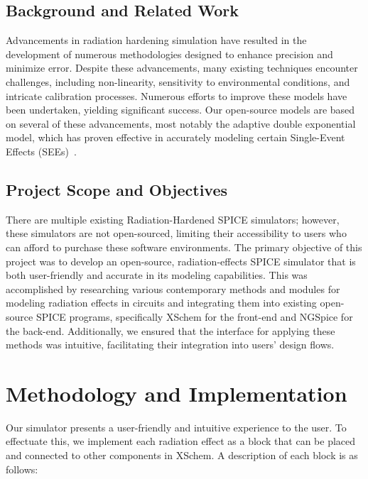 \documentclass[conference]{IEEEtran}
\begin{document}
    \subsection{Background and Related Work}\label{subsec:background-and-related-work}
    Advancements in radiation hardening simulation have resulted in the development of numerous methodologies designed to enhance precision and minimize error.
    Despite these advancements, many existing techniques encounter challenges, including non-linearity, sensitivity to environmental conditions, and intricate calibration processes.
    Numerous efforts to improve these models have been undertaken, yielding significant success.
    Our open-source models are based on several of these advancements, most notably the adaptive double exponential model, which has proven effective in accurately modeling certain Single-Event Effects (SEEs)~\cite{electronics13061073, Pellish2016}.

    \subsection{Project Scope and Objectives}\label{subsec:project-scope-and-objectives}
    There are multiple existing Radiation-Hardened SPICE simulators; however, these simulators are not open-sourced, limiting their accessibility to users who can afford to purchase these software environments.
    The primary objective of this project was to develop an open-source, radiation-effects SPICE simulator that is both user-friendly and accurate in its modeling capabilities.
    This was accomplished by researching various contemporary methods and modules for modeling radiation effects in circuits and integrating them into existing open-source SPICE programs, specifically XSchem for the front-end and NGSpice for the back-end.
    Additionally, we ensured that the interface for applying these methods was intuitive, facilitating their integration into users' design flows.


    \section{Methodology and Implementation}\label{sec:methodology-and-implementation}
    Our simulator presents a user-friendly and intuitive experience to the user.
    To effectuate this, we implement each radiation effect as a block that can be placed and connected to other components in XSchem.
    A description of each block is as follows:
\end{document}
